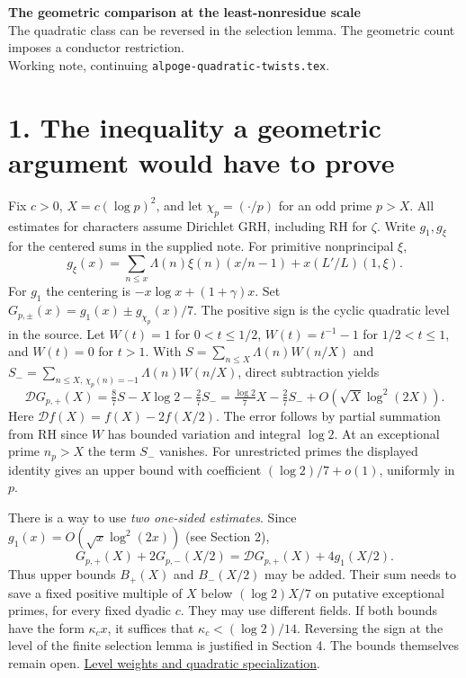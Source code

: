 \documentclass[11pt]{article}
\newcommand{\src}[2]{\href{https://github.com/Deicyde/riemann-hypothesis/blob/e7c8972c701d3396947808ab20cc16dc14623d33/src/#1.lean}{#2}}
\newcommand{\ch}{\chi_p}
\newcommand{\DD}{\mathcal D}
\begin{document}
{\Large\bfseries The geometric comparison at the least-nonresidue scale}\\[3pt]
{\large The quadratic class can be reversed in the selection lemma. The geometric count imposes a conductor restriction.}\\[4pt]
{\small Working note, continuing \texttt{alpoge-quadratic-twists.tex}.}

\section*{1. The inequality a geometric argument would have to prove}
Fix $c>0$, $X=c(\log p)^2$, and let $\ch=(\cdot/p)$ for an odd prime $p>X$. All estimates for characters assume Dirichlet GRH, including RH for $\zeta$. Write $g_1,g_\xi$ for the centered sums in the supplied note. For primitive nonprincipal $\xi$,
\[
 g_\xi(x)=\sum_{n\le x}\Lambda(n)\xi(n)(x/n-1)+x(L'/L)(1,\xi).
\]
For $g_1$ the centering is $-x\log x+(1+\gamma)x$. Set $G_{p,\pm}(x)=g_1(x)\pm g_{\ch}(x)/7$. The positive sign is the cyclic quadratic level in the source. Let $W(t)=1$ for $0<t\le 1/2$, $W(t)=t^{-1}-1$ for $1/2<t\le1$, and $W(t)=0$ for $t>1$. With $S=\sum_{n\le X}\Lambda(n)W(n/X)$ and $S_-=\sum_{n\le X,\,\ch(n)=-1}\Lambda(n)W(n/X)$, direct subtraction yields
\[
 \DD G_{p,+}(X)=\tfrac87 S-X\log 2-\tfrac27 S_-
 =\tfrac{\log 2}{7}X-\tfrac27 S_-+O(\sqrt X\log^2(2X)).
\]
Here $\DD f(X)=f(X)-2f(X/2)$. The error follows by partial summation from RH since $W$ has bounded variation and integral $\log 2$. At an exceptional prime $n_p>X$ the term $S_-$ vanishes. For unrestricted primes the displayed identity gives an upper bound with coefficient $(\log2)/7+o(1)$, uniformly in $p$.

There is a way to use \emph{two one-sided estimates}. Since $g_1(x)=O(\sqrt x\log^2(2x))$ (see Section 2),
\[
 G_{p,+}(X)+2G_{p,-}(X/2)
 =\DD G_{p,+}(X)+4g_1(X/2).
\]
Thus upper bounds $B_+(X)$ and $B_-(X/2)$ may be added. Their sum needs to save a fixed positive multiple of $X$ below $(\log 2)X/7$ on putative exceptional primes, for every fixed dyadic $c$. They may use different fields. If both bounds have the form $\kappa_c x$, it suffices that $\kappa_c<(\log 2)/14$. Reversing the sign at the level of the finite selection lemma is justified in Section 4. The bounds themselves remain open. \src{Formalism/SharpRestriction/RamificationFrobenius/TotientGaloisClasses/ExplicitFormulaErrorOfHostConditions}{Level weights and quadratic specialization}.

\newpage
\end{document}
